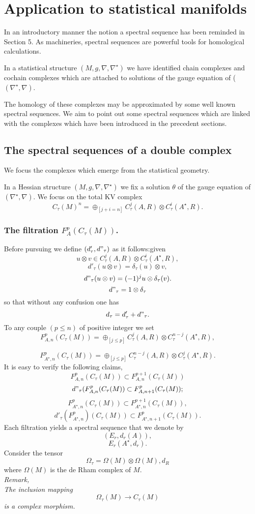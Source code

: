 \section{Application to statistical manifolds}
\label{sec:statistical}

In an introductory manner the notion a spectral sequence has been reminded in Section 5. As machineries, spectral sequences are powerful tools for homological calculations. 

In a statistical structure $(M,g,\nabla,\nabla^\star)$ we have identified chain complexes and cochain complexes which are attached to solutions of the gauge equation of ($(\nabla^\star,\nabla)$. 

The homology of these complexes may be approximated by some well known spectral sequences. We aim to point out some spectral sequences which are linked with the complexes which have been introduced in the precedent sections. 


\subsection{The spectral sequences of a double complex}
We focus the complexes which emerge from the statistical geometry.

In a Hessian structure $(M,g,\nabla,\nabla^\star)$ we fix a solution $\theta$ of the gauge equation of $(\nabla^\star,\nabla)$.
We focus on the total KV complex
$$C_\tau(M)^n = \oplus_{[j+i = n]}C^j_\tau(A,R)\otimes C^i_\tau(A^\star,R).$$
\subsubsection{The filtration $F^p_A(C_\tau(M))$.}
Before pursuing we define $(d'_\tau,d"_\tau)$ as it follows:given
$$u\otimes v \in C^j_\tau(A,R)\otimes C^i_\tau(A^\star, R),$$
$$d'_\tau(u\otimes v) = \delta_\tau (u) \otimes v,$$
$$d"_\tau(u\otimes v) = (-1)^j u\otimes \delta_\tau(v).$$
$$d"_\tau = 1 \otimes \delta_\tau$$
so that without any confusion one has
$$d_\tau = d'_\tau + d"_\tau.$$
To any couple $(p \leq n)$ of positive integer  we set 
 $$ F^p_{A,n}(C_\tau(M)) = \oplus_{[j\leq p]}C^j_\tau(A,R)\otimes 
C^{n-j}_\tau(A^\star,R), $$

$$ F^p_{A^\star,n}(C_\tau(M)) = \oplus_{[j\leq p]}C^{n-j}_\tau(A,R)\otimes C^j_\tau(A^\star,R).$$
It is easy to verify the following claims,
$$F^p_{A,n}(C_\tau(M)) \subset F^{p+1}_{A,n}(C_\tau(M))$$
$$d"_\tau (F^p_{A,n}(C_\tau(M)) \subset F^p_{A,n+1}(C_\tau(M));$$
$$F^p_{A^\star,n}(C_\tau(M)) \subset F^{p+1}_{A^\star,n}(C_\tau(M)),$$
$$d'_\tau(F^p_{A^\star,n})(C_\tau(M)) \subset F^p_{A^\star, n+1}(C_\tau(M)).$$
Each filtration yields a spectral sequence that we denote by
$$(E_r,d_r(A)),$$
$$E_r(A^\star, d_r).$$
Consider the tensor
$$\Omega_\tau = \Omega(M)\otimes\Omega(M),d_R$$
where $\Omega(M)$ is the de Rham complex of $M$.\\
\textit{Remark,\citep{boyom2016}\\
\textit{The inclusion mapping $$\Omega_\tau(M)\rightarrow C_\tau(M)$$}
 is a complex morphism.}
